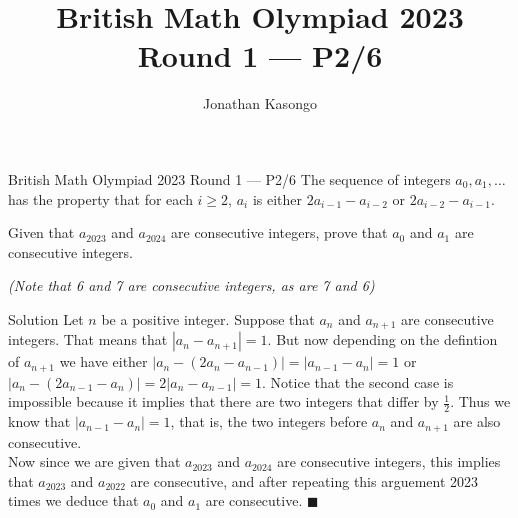 \documentclass{article}
\author{Jonathan Kasongo}
\title{British Math Olympiad 2023 Round 1 --- P2/6}
\begin{document}
\maketitle

\begin{problem}{British Math Olympiad 2023 Round 1 --- P2/6}
The sequence of integers $a_0, a_1, \ldots$ has the property that for
each $i \geq 2$, $a_i$ is either $2a_{i-1} - a_{i-2}$ or
$2a_{i-2} - a_{i-1}$.\vspace{0.2cm}

Given that $a_{2023}$ and $a_{2024}$ are consecutive integers, prove that
$a_0$ and $a_1$ are consecutive integers.\vspace{0.2cm}

\textit{(Note that 6 and 7 are consecutive integers, as are 7 and 6)}
\end{problem}

\begin{solution}{Solution}
Let $n$ be a positive integer. Suppose that $a_n$ and $a_{n + 1}$ are
consecutive integers. That means that $| a_n - a_{n+1} | = 1$. But now
depending on the defintion of $a_{n+1}$ we have either
$| a_n - (2a_n - a_{n-1}) | = | a_{n-1} - a_n | = 1$ or
$| a_n - (2a_{n-1} - a_n) | = 2 | a_n - a_{n-1} | = 1$. Notice that
the second case is impossible because it implies that there are two integers
that differ by $\frac{1}{2}$. Thus we know that $| a_{n-1} - a_{n} | = 1$,
that is, the two integers before $a_n$ and $a_{n+1}$ are also consecutive.\\

Now since we are given that $a_{2023}$ and $a_{2024}$ are consecutive
integers, this implies that $a_{2023}$ and $a_{2022}$ are consecutive,
and after repeating this arguement 2023 times we deduce that $a_0$ and
$a_1$ are consecutive. $\blacksquare$
\end{solution}
\end{document}
